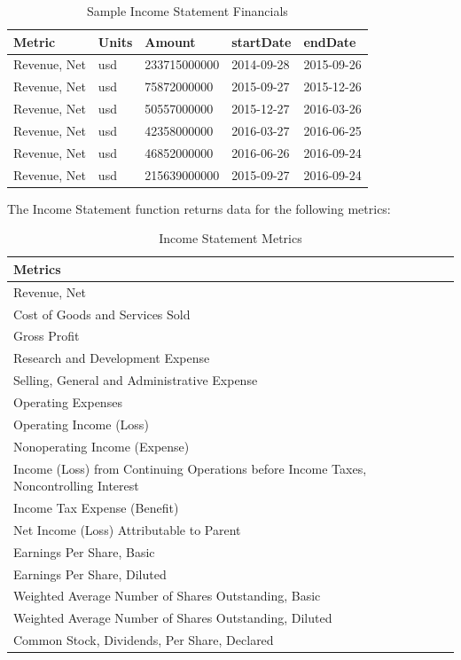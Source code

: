 \documentclass[]{book}
\theoremstyle{definition}
\theoremstyle{definition}
\theoremstyle{definition}
\theoremstyle{remark}
\begin{document}
\begin{table}[t]

\caption{\label{tab:unnamed-chunk-28}Sample Income Statement Financials}
\centering
\begin{tabular}{lllll}
\toprule
Metric & Units & Amount & startDate & endDate\\
\midrule
Revenue, Net & usd & 233715000000 & 2014-09-28 & 2015-09-26\\
Revenue, Net & usd & 75872000000 & 2015-09-27 & 2015-12-26\\
Revenue, Net & usd & 50557000000 & 2015-12-27 & 2016-03-26\\
Revenue, Net & usd & 42358000000 & 2016-03-27 & 2016-06-25\\
Revenue, Net & usd & 46852000000 & 2016-06-26 & 2016-09-24\\
\addlinespace
Revenue, Net & usd & 215639000000 & 2015-09-27 & 2016-09-24\\
\bottomrule
\end{tabular}
\end{table}

The Income Statement function returns data for the following metrics:

\begin{table}[t]

\caption{\label{tab:unnamed-chunk-29}Income Statement Metrics}
\centering
\begin{tabular}{l}
\toprule
Metrics\\
\midrule
Revenue, Net\\
Cost of Goods and Services Sold\\
Gross Profit\\
Research and Development Expense\\
Selling, General and Administrative Expense\\
\addlinespace
Operating Expenses\\
Operating Income (Loss)\\
Nonoperating Income (Expense)\\
Income (Loss) from Continuing Operations before Income Taxes, Noncontrolling Interest\\
Income Tax Expense (Benefit)\\
\addlinespace
Net Income (Loss) Attributable to Parent\\
Earnings Per Share, Basic\\
Earnings Per Share, Diluted\\
Weighted Average Number of Shares Outstanding, Basic\\
Weighted Average Number of Shares Outstanding, Diluted\\
\addlinespace
Common Stock, Dividends, Per Share, Declared\\
\bottomrule
\end{tabular}
\end{table}
\end{document}
